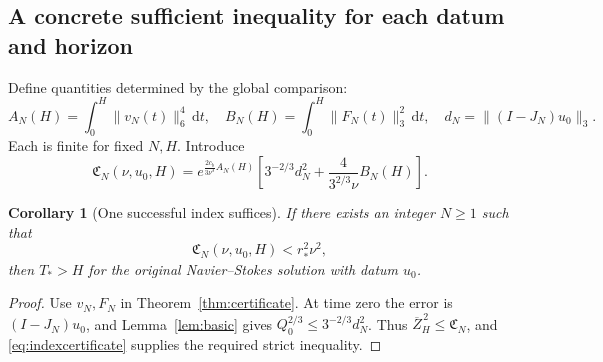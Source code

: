 \documentclass[11pt,a4paper]{article}
\newtheorem{corollary}[theorem]{Corollary}
\theoremstyle{definition}\newtheorem{definition}[theorem]{Definition}
\theoremstyle{remark}\newtheorem{remark}[theorem]{Remark}
\newcommand{\dd}{\,\mathrm d}
\newcommand{\norm}[1]{\lVert #1\rVert}
\newcommand{\rstar}{r_*}
\newcommand{\cb}{c_b}
\numberwithin{equation}{section}
\begin{document}
\subsection{A concrete sufficient inequality for each datum and horizon}
Define quantities determined by the global comparison:
\begin{equation}\label{eq:ABN}
 A_N(H)=\int_0^H\norm{v_N(t)}_6^4\dd t,\quad
 B_N(H)=\int_0^H\norm{F_N(t)}_3^2\dd t,\quad
 d_N=\norm{(I-J_N)u_0}_3.
\end{equation}
Each is finite for fixed $N,H$. Introduce
\begin{equation}\label{eq:CN}
 \mathfrak C_N(\nu,u_0,H)=
 e^{\frac{2\cb}{3\nu^3}A_N(H)}
 \left[3^{-2/3}d_N^2+\frac4{3^{2/3}\nu}B_N(H)\right].
\end{equation}

\begin{corollary}[One successful index suffices]\label{cor:index}
If there exists an integer $N\ge1$ such that
\begin{equation}\label{eq:indexcertificate}
 \mathfrak C_N(\nu,u_0,H)<\rstar^2\nu^2,
\end{equation}
then $T_*>H$ for the original Navier--Stokes solution with datum $u_0$.
\end{corollary}
\begin{proof}
Use $v_N,F_N$ in Theorem~\ref{thm:certificate}. At time zero the error is $(I-J_N)u_0$, and Lemma~\ref{lem:basic} gives $Q_0^{2/3}\le3^{-2/3}d_N^2$. Thus $\overline Z_H^{\,2}\le\mathfrak C_N$, and \eqref{eq:indexcertificate} supplies the required strict inequality.
\end{proof}
\end{document}
